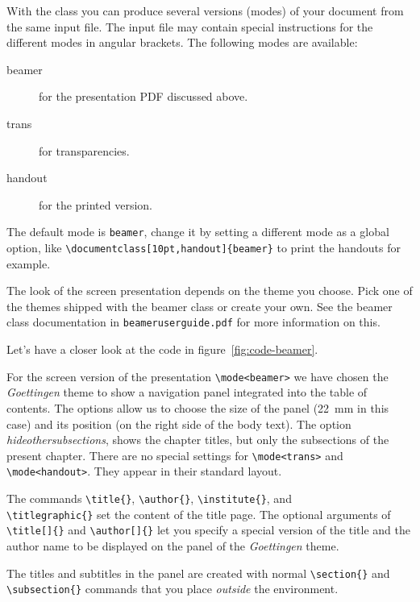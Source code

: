 With the  class you can produce several versions (modes) of your
document from the same input file. The input file may contain special
instructions for the different modes in angular brackets. The
following modes are available:
\begin{description}
  \item[beamer] for the presentation PDF
    discussed above.
  \item[trans] for transparencies.
  \item[handout] for the printed version.
\end{description}
The default mode is \texttt{beamer}, change it by setting a
different mode as a global option, like
\verb|\documentclass[10pt,handout]{beamer}| to print the handouts for
example.

The look of the screen presentation depends on the theme you choose. Pick one of the themes shipped with the beamer class or
create your own. See the beamer class documentation in
\texttt{beameruserguide.pdf} for more information on this.

Let's have a closer look at the code in figure~\ref{fig:code-beamer}.

For the screen version of the presentation \verb|\mode<beamer>| we
have chosen the \emph{Goettingen} theme to show a navigation panel
integrated into the table of contents. The options allow us to choose the
size of the panel (22~mm in this case) and its position (on the right
side of the body text). The option \emph{hideothersubsections}, shows
the chapter titles, but only the subsections of the present
chapter. There are no special settings for \verb|\mode<trans>| and
\verb|\mode<handout>|. They appear in their standard layout.

The commands \verb|\title{}|, \verb|\author{}|, \verb|\institute{}|,
and\\ \verb|\titlegraphic{}| set the content of the title page. The
optional arguments of \verb|\title[]{}| and \verb|\author[]{}|
let you specify a special version of the title and the author
name to be displayed on the panel of the \emph{Goettingen} theme.

The titles and subtitles in the panel are created with normal
\verb|\section{}| and \verb|\subsection{}| commands that you place
\emph{outside} the  environment.


